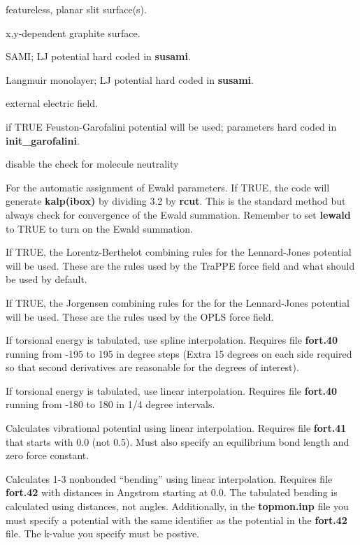 \documentclass[12pt,letterpaper]{article}
\begin{document}
 featureless, planar slit surface(s).

 x,y-dependent graphite surface.

 SAMI; LJ potential hard coded in {\bf susami}.

 Langmuir monolayer; LJ potential hard coded in {\bf susami}.

 external electric field.

 if TRUE Feuston-Garofalini potential
will be used; parameters hard coded in
{\bf init\_garofalini}.

 disable the check for molecule neutrality

 For the automatic assignment
of Ewald parameters. If TRUE, the code will generate {\bf
  kalp(ibox)} by dividing 3.2 by {\bf rcut}. This is the
standard method but always check for convergence of the
Ewald summation. Remember to set {\bf lewald} to TRUE to
turn on the Ewald summation.

 If TRUE, the Lorentz-Berthelot
combining rules for the Lennard-Jones potential will be
used. These are the rules used by the TraPPE force field and
what should be used by default.

 If TRUE, the Jorgensen combining
rules for the for the Lennard-Jones potential will be used.
These are the rules used by the OPLS force field.

 If torsional energy is tabulated,
use spline interpolation. Requires file {\bf fort.40}
running from -195 to 195 in degree steps (Extra 15 degrees
on each side required so that second derivatives are
reasonable for the degrees of interest).

 If torsional energy is tabulated,
use linear interpolation. Requires file {\bf fort.40}
running from -180 to 180 in 1/4 degree intervals.

 Calculates vibrational
potential using linear interpolation. Requires file
{\bf fort.41} that starts with 0.0 (not 0.5). Must also specify
an equilibrium bond length and zero force constant.

 Calculates 1-3 nonbonded
``bending'' using linear interpolation. Requires file {\bf
  fort.42} with distances in Angstrom starting at 0.0. The
tabulated bending is calculated using distances, not angles.
Additionally, in the {\bf topmon.inp} file you must specify
a potential with the same identifier as the potential in the
{\bf fort.42} file. The k-value you specify must be postive.
\end{document}
